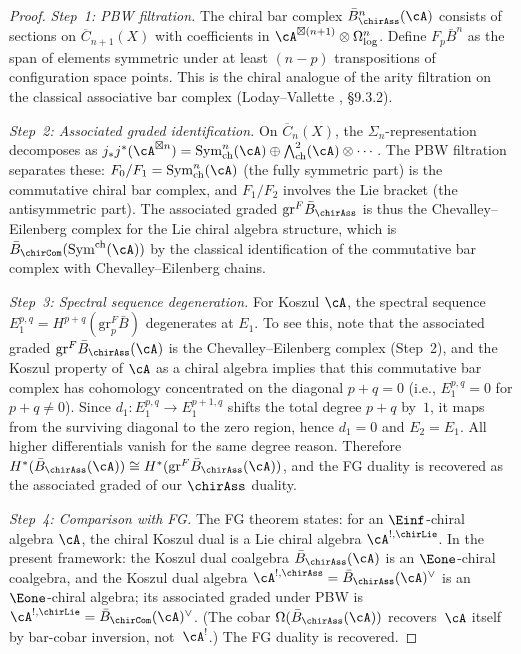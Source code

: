 \begin{proof}
\emph{Step~1: PBW filtration.}
The chiral bar complex $\bar{B}^n_{\chirAss}(\cA)$ consists of sections on $\overline{C}_{n+1}(X)$ with coefficients in $\cA^{\boxtimes(n+1)} \otimes \Omega^n_{\log}$.  Define $F_p \bar{B}^n$ as the span of elements symmetric under at least $(n-p)$ transpositions of configuration space points.  This is the chiral analogue of the arity filtration on the classical associative bar complex (Loday--Vallette \cite{LV12}, \S9.3.2).

\emph{Step~2: Associated graded identification.}
On $\overline{C}_n(X)$, the $\Sigma_n$-representation decomposes as $j_*j^*(\cA^{\boxtimes n}) = \mathrm{Sym}^n_{\mathrm{ch}}(\cA) \oplus \bigwedge^2_{\mathrm{ch}}(\cA) \otimes \cdots$.  The PBW filtration separates these: $F_0/F_1 = \mathrm{Sym}^n_{\mathrm{ch}}(\cA)$ (the fully symmetric part) is the commutative chiral bar complex, and $F_1/F_2$ involves the Lie bracket (the antisymmetric part).  The associated graded $\mathrm{gr}^F \bar{B}_{\chirAss}$ is thus the Chevalley--Eilenberg complex for the Lie chiral algebra structure, which is $\bar{B}_{\chirCom}(\mathrm{Sym}^{\mathrm{ch}}(\cA))$ by the classical identification of the commutative bar complex with Chevalley--Eilenberg chains.

\emph{Step~3: Spectral sequence degeneration.}
For Koszul $\cA$, the spectral sequence $E_1^{p,q} = H^{p+q}(\mathrm{gr}^F_p \bar{B})$ degenerates at $E_1$.  To see this, note that the associated graded $\mathrm{gr}^F \bar{B}_{\chirAss}(\cA)$ is the Chevalley--Eilenberg complex (Step~2), and the Koszul property of $\cA$ as a chiral algebra implies that this commutative bar complex has cohomology concentrated on the diagonal $p + q = 0$ (i.e., $E_1^{p,q} = 0$ for $p + q \neq 0$).  Since $d_1\colon E_1^{p,q} \to E_1^{p+1,q}$ shifts the total degree $p+q$ by~$1$, it maps from the surviving diagonal to the zero region, hence $d_1 = 0$ and $E_2 = E_1$.  All higher differentials vanish for the same degree reason.  Therefore $H^*(\bar{B}_{\chirAss}(\cA)) \cong H^*(\mathrm{gr}^F \bar{B}_{\chirAss}(\cA))$, and the FG duality is recovered as the associated graded of our $\chirAss$ duality.

\emph{Step~4: Comparison with FG.}
The FG theorem states: for an $\Einf$-chiral algebra $\cA$, the chiral Koszul dual is a Lie chiral algebra $\cA^{!,\chirLie}$.  In the present framework: the Koszul dual coalgebra $\bar{B}_{\chirAss}(\cA)$ is an $\Eone$-chiral coalgebra, and the Koszul dual algebra $\cA^{!,\chirAss} = \bar{B}_{\chirAss}(\cA)^\vee$ is an $\Eone$-chiral algebra; its associated graded under PBW is $\cA^{!,\chirLie} = \bar{B}_{\chirCom}(\cA)^\vee$.  (The cobar $\Omega(\bar{B}_{\chirAss}(\cA))$ recovers~$\cA$ itself by bar-cobar inversion, not~$\cA^!$.)  The FG duality is recovered.
\end{proof}

